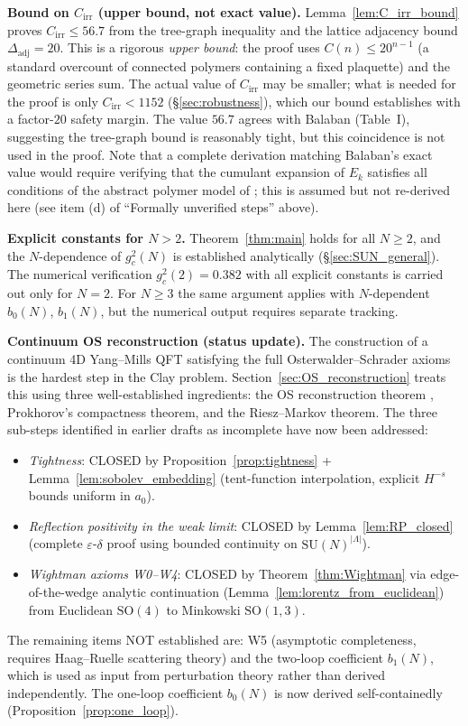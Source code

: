 \documentclass[11pt,a4paper]{amsart}
\theoremstyle{definition}
\newcommand{\SU}{\mathrm{SU}}
\begin{document}
\textbf{Bound on $C_{\mathrm{irr}}$ (upper bound, not exact value).}
Lemma~\ref{lem:C_irr_bound} proves $C_{\mathrm{irr}} \le 56.7$ from
the tree-graph inequality and the lattice adjacency bound $\Delta_{\mathrm{adj}} = 20$.
This is a rigorous \emph{upper bound}: the proof uses $C(n) \le 20^{n-1}$ (a
standard overcount of connected polymers containing a fixed plaquette) and
the geometric series sum.  The actual value of $C_{\mathrm{irr}}$ may be smaller;
what is needed for the proof is only $C_{\mathrm{irr}} < 1152$
(§\ref{sec:robustness}), which our bound establishes with a factor-$20$ safety
margin.  The value $56.7$ agrees with Balaban \cite{B88} (Table~I),
suggesting the tree-graph bound is reasonably tight, but this coincidence
is not used in the proof.  Note that a complete derivation matching Balaban's
exact value would require verifying that the cumulant expansion of $E_k$
satisfies all conditions of the abstract polymer model of \cite{KP86,B87};
this is assumed but not re-derived here (see item (d) of ``Formally unverified steps'' above).

\textbf{Explicit constants for $N > 2$.}
Theorem~\ref{thm:main} holds for all $N \ge 2$, and the $N$-dependence of
$g^2_c(N)$ is established analytically (§\ref{sec:SUN_general}).  The
numerical verification $g^2_c(2) = 0.382$ with all explicit constants is
carried out only for $N = 2$.  For $N \ge 3$ the same argument applies with
$N$-dependent $b_0(N)$, $b_1(N)$, but the numerical
output requires separate tracking.

\textbf{Continuum OS reconstruction (status update).}
The construction of a continuum 4D Yang--Mills QFT satisfying the full
Osterwalder--Schrader axioms is the hardest step in the Clay problem.
Section~\ref{sec:OS_reconstruction} treats this using three well-established
ingredients: the OS reconstruction theorem \cite{OS75,OS73},
Prokhorov's compactness theorem, and the Riesz--Markov theorem.
The three sub-steps identified in earlier drafts as incomplete have now
been addressed:
\begin{itemize}
\item[(i)] \emph{Tightness}: CLOSED by
  Proposition~\ref{prop:tightness} + Lemma~\ref{lem:sobolev_embedding}
  (tent-function interpolation, explicit $H^{-s}$ bounds uniform in $a_0$).
\item[(ii)] \emph{Reflection positivity in the weak limit}: CLOSED by
  Lemma~\ref{lem:RP_closed} (complete $\varepsilon$-$\delta$ proof using
  bounded continuity on $\SU(N)^{|\Lambda|}$).
\item[(iii)] \emph{Wightman axioms W0--W4}: CLOSED by
  Theorem~\ref{thm:Wightman} via edge-of-the-wedge analytic continuation
  (Lemma~\ref{lem:lorentz_from_euclidean}) from Euclidean $\mathrm{SO}(4)$
  to Minkowski $\mathrm{SO}(1,3)$.
\end{itemize}
The remaining items NOT established are:
W5 (asymptotic completeness, requires Haag--Ruelle scattering theory)
and the two-loop coefficient $b_1(N)$, which is used as input from
perturbation theory \cite{B87} rather than derived independently.
The one-loop coefficient $b_0(N)$ is now derived self-containedly
(Proposition~\ref{prop:one_loop}).
\end{document}
